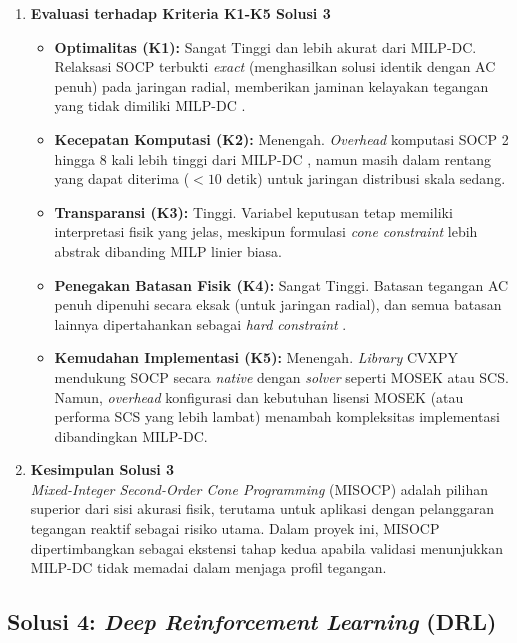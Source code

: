 \begin{enumerate}
\item[b.] \textbf{Evaluasi terhadap Kriteria K1-K5 Solusi 3}
\begin{itemize}
    \item[i.] \textbf{Optimalitas (K1):} Sangat Tinggi dan lebih akurat dari MILP-DC. Relaksasi SOCP terbukti \textit{exact} (menghasilkan solusi identik dengan AC penuh) pada jaringan radial, memberikan jaminan kelayakan tegangan yang tidak dimiliki MILP-DC \cite{Maria2021}.
   \item[ii.] \textbf{Kecepatan Komputasi (K2):} Menengah. \textit{Overhead} komputasi SOCP 2 hingga 8 kali lebih tinggi dari MILP-DC \cite{Fu2019}, namun masih dalam rentang yang dapat diterima ($< 10$ detik) untuk jaringan distribusi skala sedang.
    \item[iii.] \textbf{Transparansi (K3):} Tinggi. Variabel keputusan tetap memiliki interpretasi fisik yang jelas, meskipun formulasi \textit{cone constraint} lebih abstrak dibanding MILP linier biasa.
    \item[iv.] \textbf{Penegakan Batasan Fisik (K4):} Sangat Tinggi. Batasan tegangan AC penuh dipenuhi secara eksak (untuk jaringan radial), dan semua batasan lainnya dipertahankan sebagai \textit{hard constraint} \cite{Maria2021, Fu2019}.
    \item[v.] \textbf{Kemudahan Implementasi (K5):} Menengah. \textit{Library} CVXPY mendukung SOCP secara \textit{native} dengan \textit{solver} seperti MOSEK atau SCS. Namun, \textit{overhead} konfigurasi dan kebutuhan lisensi MOSEK (atau performa SCS yang lebih lambat) menambah kompleksitas implementasi dibandingkan MILP-DC.
\end{itemize}
 
\item[c.] \textbf{Kesimpulan Solusi 3} \\
\textit{Mixed-Integer Second-Order Cone Programming} (MISOCP) adalah pilihan superior dari sisi akurasi fisik, terutama untuk aplikasi dengan pelanggaran tegangan reaktif sebagai risiko utama. Dalam proyek ini, MISOCP dipertimbangkan sebagai ekstensi tahap kedua apabila validasi menunjukkan MILP-DC tidak memadai dalam menjaga profil tegangan.
\end{enumerate}

\subsection{Solusi 4: \textit{Deep Reinforcement Learning} (DRL)}
\label{subsec:Solusi_4}

